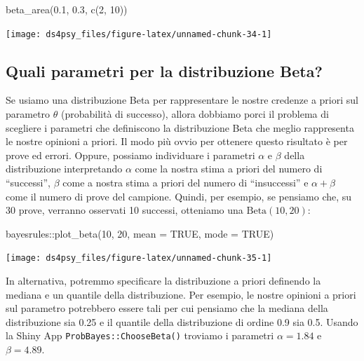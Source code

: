 \documentclass[
  11pt,
]{krantz}
\makeatletter
\newenvironment{Shaded}{\begin{snugshade}}{\end{snugshade}}
\newcommand{\AttributeTok}[1]{\textcolor[rgb]{0.61,0.61,0.61}{#1}}
\newcommand{\ConstantTok}[1]{\textcolor[rgb]{0,0,0}{#1}}
\newcommand{\DecValTok}[1]{\textcolor[rgb]{0.06,0.06,0.06}{#1}}
\newcommand{\FloatTok}[1]{\textcolor[rgb]{0.06,0.06,0.06}{#1}}
\newcommand{\FunctionTok}[1]{\textcolor[rgb]{0,0,0}{#1}}
\newcommand{\NormalTok}[1]{#1}
\newcommand{\SpecialCharTok}[1]{\textcolor[rgb]{0,0,0}{#1}}
\newenvironment{kframe}{%
\medskip{}
\setlength{\fboxsep}{.8em}
 \def\at@end@of@kframe{}%
 \ifinner\ifhmode%
  \def\at@end@of@kframe{\end{minipage}}%
  \begin{minipage}{\columnwidth}%
 \fi\fi%
 \def\FrameCommand##1{\hskip\@totalleftmargin \hskip-\fboxsep
 \colorbox{shadecolor}{##1}\hskip-\fboxsep
     \hskip-\linewidth \hskip-\@totalleftmargin \hskip\columnwidth}%
 \MakeFramed {\advance\hsize-\width
   \@totalleftmargin\z@ \linewidth\hsize
   \@setminipage}}%
 {\par\unskip\endMakeFramed%
 \at@end@of@kframe}
\renewenvironment{Shaded}{\begin{kframe}}{\end{kframe}}
\theoremstyle{definition}
\theoremstyle{definition}
\theoremstyle{definition}
\theoremstyle{definition}
\theoremstyle{remark}
\makeatother
\begin{document}
\begin{Shaded}
\begin{Highlighting}[]
\FunctionTok{beta\_area}\NormalTok{(}\FloatTok{0.1}\NormalTok{, }\FloatTok{0.3}\NormalTok{, }\FunctionTok{c}\NormalTok{(}\DecValTok{2}\NormalTok{, }\DecValTok{10}\NormalTok{))}
\end{Highlighting}
\end{Shaded}

\begin{center}\texttt{[image: ds4psy\_files/figure-latex/unnamed-chunk-34-1]} \end{center}

\hypertarget{quali-parametri-per-la-distribuzione-beta}{%
\subsection{Quali parametri per la distribuzione Beta?}\label{quali-parametri-per-la-distribuzione-beta}}

Se usiamo una distribuzione Beta per rappresentare le nostre credenze a priori sul parametro \(\theta\) (probabilità di successo), allora dobbiamo porci il problema di scegliere i parametri che definiscono la distribuzione Beta che meglio rappresenta le nostre opinioni a priori. Il modo più ovvio per ottenere questo risultato è per prove ed errori. Oppure, possiamo individuare i parametri \(\alpha\) e \(\beta\) della distribuzione interpretando \(\alpha\) come la nostra stima a priori del numero di ``successi'', \(\beta\) come a nostra stima a priori del numero di ``insuccessi'' e \(\alpha + \beta\) come il numero di prove del campione. Quindi, per esempio, se pensiamo che, su 30 prove, verranno osservati 10 successi, otteniamo una \(\mbox{Beta}(10, 20)\):

\begin{Shaded}
\begin{Highlighting}[]
\NormalTok{bayesrules}\SpecialCharTok{::}\FunctionTok{plot\_beta}\NormalTok{(}\DecValTok{10}\NormalTok{, }\DecValTok{20}\NormalTok{, }\AttributeTok{mean =} \ConstantTok{TRUE}\NormalTok{, }\AttributeTok{mode =} \ConstantTok{TRUE}\NormalTok{)}
\end{Highlighting}
\end{Shaded}

\begin{center}\texttt{[image: ds4psy\_files/figure-latex/unnamed-chunk-35-1]} \end{center}

In alternativa, potremmo specificare la distribuzione a priori definendo la mediana e un quantile della distribuzione. Per esempio, le nostre opinioni a priori sul parametro potrebbero essere tali per cui pensiamo che la mediana della distribuzione sia 0.25 e il quantile della distribuzione di ordine 0.9 sia 0.5. Usando la Shiny App \texttt{ProbBayes::ChooseBeta()} troviamo i parametri \(\alpha = 1.84\) e \(\beta = 4.89\).
\end{document}
